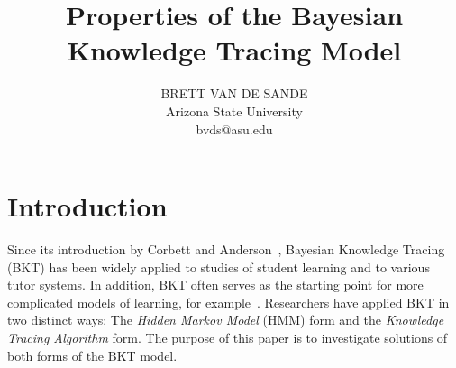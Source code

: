\documentclass[jedm,acmnow]{acmtrans2m}
\title{\sffamily Properties of the Bayesian Knowledge Tracing Model}
\author{\linespread{1}\selectfont \MakeUppercase{Brett van de Sande}\\
Arizona State University\\
bvds@asu.edu}
\begin{document}
\maketitle

%
%


\section{Introduction}

Since its introduction by Corbett and 
Anderson~\citeyear{corbett_knowledge_1995}, 
Bayesian Knowledge Tracing (BKT) has been widely applied
to studies of student learning and to various tutor systems.  
In addition, BKT often serves as the starting
%
%
point for more complicated models of learning, for 
example~\cite{baker_improving_2008,lee_impact_2012}.
Researchers have applied BKT in two distinct ways:  
The {\em Hidden Markov Model} (HMM) form and the 
{\em Knowledge Tracing Algorithm} form.
The purpose of this paper is to investigate solutions of both
forms of the BKT model.
\end{document}
